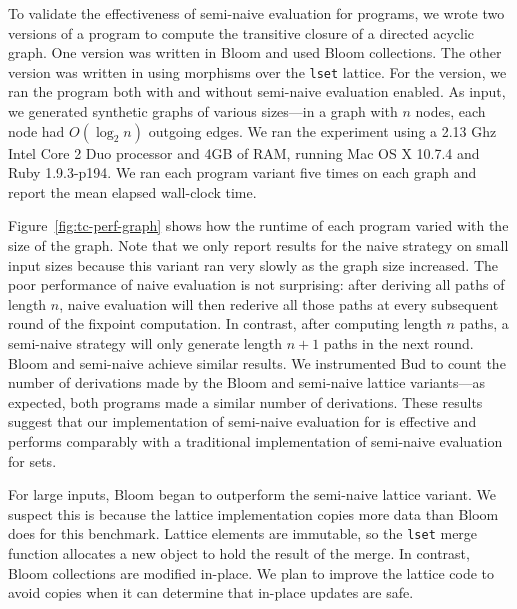 To validate the effectiveness of semi-naive evaluation for \lang programs, we
wrote two versions of a program to compute the transitive closure of a directed
acyclic graph. One version was written in Bloom and used Bloom collections. The
other version was written in \lang using morphisms over the \texttt{lset}
lattice. For the \lang version, we ran the program both with and without
semi-naive evaluation enabled. As input, we generated synthetic graphs of
various sizes---in a graph with $n$ nodes, each node had $O(\log_2 n)$  outgoing
edges. We ran the experiment using a 2.13 Ghz Intel Core 2 Duo processor and 4GB
of RAM, running Mac OS X 10.7.4 and Ruby 1.9.3-p194. We ran each program variant
five times on each graph and report the mean elapsed wall-clock time.

Figure~\ref{fig:tc-perf-graph} shows how the runtime of each program varied with
the size of the graph. Note that we only report results for the naive \lang
strategy on small input sizes because this variant ran very slowly as the graph
size increased. The poor performance of naive evaluation is not surprising:
after deriving all paths of length $n$, naive evaluation will then rederive all
those paths at every subsequent round of the fixpoint computation. In contrast,
after computing length $n$ paths, a semi-naive strategy will only generate
length $n+1$ paths in the next round. Bloom and semi-naive \lang achieve similar
results. We instrumented Bud to count the number of derivations made by the
Bloom and semi-naive lattice variants---as expected, both programs made a
similar number of derivations. These results suggest that our implementation of
semi-naive evaluation for \lang is effective and performs comparably with
a traditional implementation of semi-naive evaluation for sets.

For large inputs, Bloom began to outperform the semi-naive lattice variant. We
suspect this is because the lattice implementation copies more data than Bloom
does for this benchmark. Lattice elements are immutable, so the \texttt{lset}
merge function allocates a new object to hold the result of the merge. In
contrast, Bloom collections are modified in-place. We plan to improve the
lattice code to avoid copies when it can determine that in-place updates are
safe.

